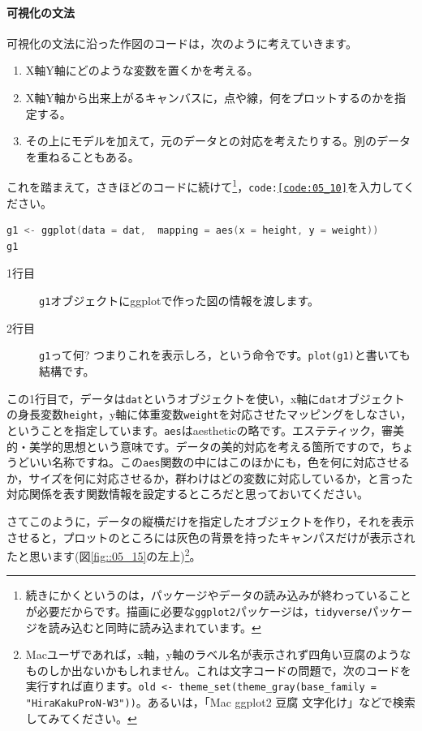 \documentclass{ltjsbook}
\begin{document}
\paragraph{可視化の文法}
可視化の文法に沿った作図のコードは，次のように考えていきます。
\begin{enumerate}
	\item X軸Y軸にどのような変数を置くかを考える。
	\item X軸Y軸から出来上がるキャンバスに，点や線，何をプロットするのかを指定する。
	\item その上にモデルを加えて，元のデータとの対応を考えたりする。別のデータを重ねることもある。
\end{enumerate}
これを踏まえて，さきほどのコードに続けて\footnote{続きにかくというのは，パッケージやデータの読み込みが終わっていることが必要だからです。描画に必要な\texttt{ggplot2}パッケージは，\texttt{tidyverse}パッケージを読み込むと同時に読み込まれています。}，\texttt{code:\ref{code:05_10}}を入力してください。

\begin{lstlisting}[language=c++,label={code:05_10},caption={まずはキャンパスを設定する}]
g1 <- ggplot(data = dat,  mapping = aes(x = height, y = weight))
g1
\end{lstlisting}

\begin{description}
	\item[1行目] \texttt{g1}オブジェクトにggplotで作った図の情報を渡します。
	\item[2行目] \texttt{g1}って何? つまりこれを表示しろ，という命令です。\texttt{plot(g1)}と書いても結構です。
\end{description}
この1行目で，データは\texttt{dat}というオブジェクトを使い，x軸に\texttt{dat}オブジェクトの身長変数\verb|height|，y軸に体重変数\verb|weight|を対応させたマッピングをしなさい，ということを指定しています。\texttt{aes}はaestheticの略です。エステティック，審美的・美学的思想という意味です。データの美的対応を考える箇所ですので，ちょうどいい名称ですね。この\texttt{aes}関数の中にはこのほかにも，色を何に対応させるか，サイズを何に対応させるか，群わけはどの変数に対応しているか，と言った対応関係を表す関数情報を設定するところだと思っておいてください。

さてこのように，データの縦横だけを指定したオブジェクトを作り，それを表示させると，プロットのところには灰色の背景を持ったキャンパスだけが表示されたと思います(図\ref{fig::05_15}の左上)\footnote{Macユーザであれば，x軸，y軸のラベル名が表示されず四角い豆腐のようなものしか出ないかもしれません。これは文字コードの問題で，次のコードを実行すれば直ります。\verb|old <- theme_set(theme_gray(base_family = "HiraKakuProN-W3"))|。あるいは，「Mac ggplot2 豆腐 文字化け」などで検索してみてください。}。
\end{document}
